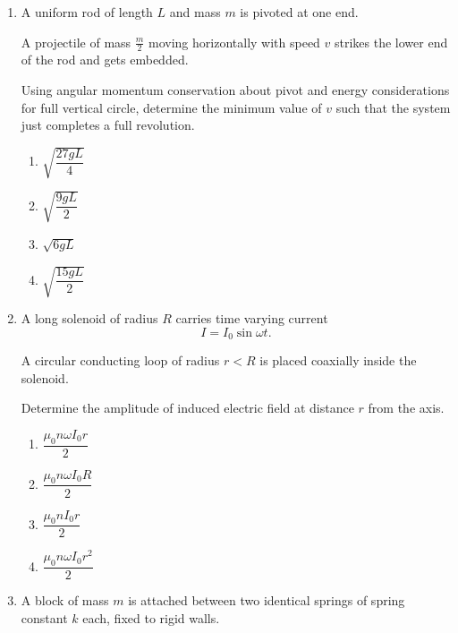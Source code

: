 \documentclass[12pt]{article}
\begin{document}
\begin{enumerate}[leftmargin=*]
Determine the total distance travelled by the rod before coming to rest due to magnetic braking.

\begin{enumerate}
\item $\dfrac{mRv_0}{B^2l^2}$
\item $\dfrac{mv_0}{B^2l^2R}$
\item $\dfrac{mRv_0}{2B^2l^2}$
\item $\dfrac{mv_0^2R}{B^2l^2}$
\end{enumerate}

\item A uniform rod of length $L$ and mass $m$ is pivoted at one end.  

A projectile of mass $\frac{m}{2}$ moving horizontally with speed $v$ strikes the lower end of the rod and gets embedded.  

Using angular momentum conservation about pivot and energy considerations for full vertical circle, determine the minimum value of $v$ such that the system just completes a full revolution.

\begin{enumerate}
\item $\sqrt{\dfrac{27gL}{4}}$
\item $\sqrt{\dfrac{9gL}{2}}$
\item $\sqrt{6gL}$
\item $\sqrt{\dfrac{15gL}{2}}$
\end{enumerate}

\item A long solenoid of radius $R$ carries time varying current
\[
I=I_0\sin\omega t.
\]

A circular conducting loop of radius $r<R$ is placed coaxially inside the solenoid.  

Determine the amplitude of induced electric field at distance $r$ from the axis.

\begin{enumerate}
\item $\dfrac{\mu_0 n \omega I_0 r}{2}$
\item $\dfrac{\mu_0 n \omega I_0 R}{2}$
\item $\dfrac{\mu_0 n I_0 r}{2}$
\item $\dfrac{\mu_0 n \omega I_0 r^2}{2}$
\end{enumerate}

\item A block of mass $m$ is attached between two identical springs of spring constant $k$ each, fixed to rigid walls.  


\end{enumerate}
\end{document}
